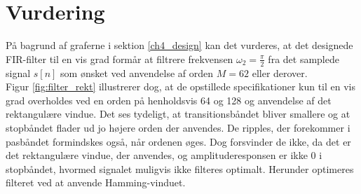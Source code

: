 \section{Vurdering}
På bagrund af graferne i sektion \ref{ch4_design} kan det vurderes, at det designede FIR-filter til en vis grad formår at filtrere frekvensen $\omega_2=\frac{\pi}{2}$ fra det samplede signal $s[n]$ som ønsket ved anvendelse af orden $M=62$ eller derover. \\
Figur \ref{fig:filter_rekt} illustrerer dog, at de opstillede specifikationer kun til en vis grad overholdes ved en orden på henholdsvis 64 og 128 og anvendelse af det rektangulære vindue. Det ses tydeligt, at transitionsbåndet bliver smallere og at stopbåndet flader ud jo højere orden der anvendes. De ripples, der forekommer i pasbåndet formindskes også, når ordenen øges. Dog forsvinder de ikke, da det er det rektangulære vindue, der anvendes, og amplituderesponsen er ikke 0 i stopbåndet, hvormed signalet muligvis ikke filteres optimalt. Herunder optimeres filteret ved at anvende Hamming-vinduet.


